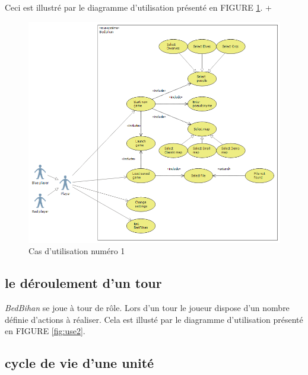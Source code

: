 		Ceci est illustré par le diagramme d'utilisation présenté en FIGURE \ref{fig:use1}.
+
		\begin{figure}
			\begin{center}
				\includegraphics[width=1\textwidth]{figure/cas_utilisation_1}
			\end{center}
			\caption{Cas d'utilisation numéro 1}
			\label{fig:use1}
		\end{figure}



	\subsection{le déroulement d'un tour}

		\emph{BedBihan} se joue à tour de rôle. Lors d'un tour le joueur dispose d'un nombre définie d'actions à réaliser. Cela est illusté par le diagramme d'utilisation présenté en FIGURE \ref{fig:use2}.


	\subsection{cycle de vie d'une unité}

